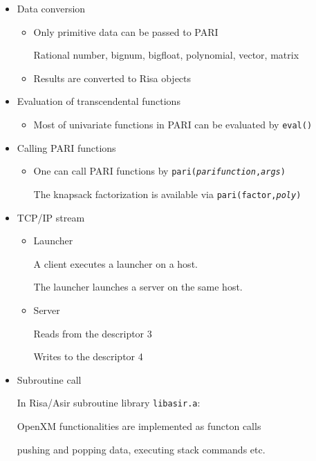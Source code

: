 \begin{slide}{}

\begin{itemize}
\item Data conversion

\begin{itemize}

\item Only primitive data can be passed to PARI

Rational number, bignum, bigfloat, polynomial,
vector, matrix

\item Results are converted to Risa objects

\end{itemize}

\item Evaluation of transcendental functions

\begin{itemize}
\item Most of univariate functions in PARI can be 
evaluated by {\tt eval()}
\end{itemize}

\item Calling PARI functions

\begin{itemize}
\item One can call PARI functions by {\tt pari({\it parifunction},{\it args})}

The knapsack factorization is available via {\tt pari(factor,{\it poly})}
\end{itemize}
\end{itemize}
\end{slide}

\begin{slide}{}

\begin{itemize}
\item TCP/IP stream

\begin{itemize}
\item Launcher

A client executes a launcher on a host.

The launcher launches a server on the same host.

\item Server

Reads from the descriptor 3

Writes to the descriptor 4

\end{itemize}

\item Subroutine call

In Risa/Asir subroutine library {\tt libasir.a}:

OpenXM functionalities are implemented as functon calls

pushing and popping data, executing stack commands etc.
\end{itemize}
\end{slide}

